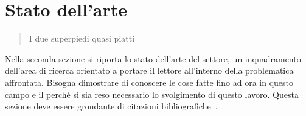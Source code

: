 \chapter{Stato dell'arte}
\label{capitolo1}
\thispagestyle{empty}

\begin{quotation}
{\footnotesize
{}
\begin{flushright}
I due superpiedi quasi piatti
\end{flushright}
}
\end{quotation}
\vspace{0.5cm}

\noindent Nella seconda sezione si riporta lo stato dell'arte del settore, un inquadramento dell'area di ricerca orientato a portare il lettore all'interno della problematica affrontata. Bisogna dimostrare di conoscere le cose fatte fino ad ora in questo campo e il perch\'e si sia reso necessario lo svolgimento di questo lavoro. Questa sezione deve essere grondante di citazioni bibliografiche~\cite{marco02bud}.
